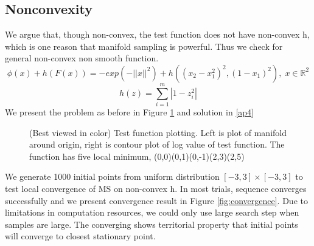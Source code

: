 \documentclass[10pt, oneside]{article}
\begin{document}
\subsection{Nonconvexity}
We argue that, though non-convex, the test function does not have non-convex h, which is one reason that manifold sampling is powerful. Thus we check for general non-convex non smooth function. 
\begin{equation}
\label{testfunc3}
\phi(x)+h(F(x))=-exp(-||x||^2)+h((x_2-x_1^2)^2,(1-x_1)^2), \;x\in \mathbb{R}^2
\end{equation}
$$
h(z)=\sum_{i=1}^m |1-z_i^2|
$$
We present the problem as before in Figure \ref{fig:function3} and solution in \ref{ap4}

\begin{figure}[H]
\centering

   \caption{(Best viewed in color) Test function plotting. Left is plot of manifold around origin, right is contour plot of log value of test function. The function has five local minimum, (0,0)(0,1)(0,-1)(2,3)(2,5)}
\label{fig:function3}
  \end{figure}
  
  We generate 1000 initial points from uniform distribution $[-3,3]\times [-3,3]$ to test local convergence of MS on non-convex h. In most trials, sequence converges successfully and we present convergence result in Figure \ref{fig:convergence}. Due to limitations in computation resources, we could only use large search step when samples are large. The converging shows territorial property that initial points will converge to closest stationary point. 
  
\end{document}

